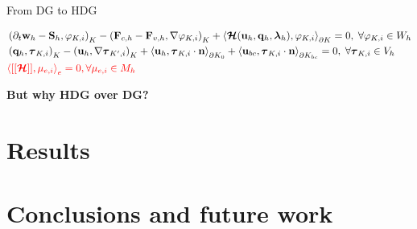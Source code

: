 \documentclass[24pt,t,table, aspectratio=169]{beamer}
\newcommand{\vecu}{\mathbf{u}}
\newcommand{\vecF}{\mathbf{F}}
\newcommand{\vecS}{\mathbf{S}}
\newcommand{\vecq}{\mathbf{q}}
\newcommand{\vecw}{\mathbf{w}}
\newcommand{\vectau}{\boldsymbol{\tau}}
\newcommand{\vecHcal}{\boldsymbol{\mathcal{H}}}
\newcommand{\veclambda}{\boldsymbol{\lambda}}
\newcommand{\vecn}{\mathbf{n}}
\begin{document}
\begin{frame}{From DG to HDG}
{
\begin{framed}
\small
\begin{equation*}
\begin{aligned}
& \left(\partial_t \vecw_{h} - \vecS_{h}, \varphi_{K,i} \right)_{K} - \left(\vecF_{c, {h}} - \vecF_{v, {h}}, \nabla \varphi_{K,i} \right)_{K} + \left\langle \vecHcal(\vecu_h, \vecq_h, \veclambda_h), \varphi_{K,i} \right\rangle_{\partial K} = 0, \; \forall \varphi_{K,i} \in W_h\\
& \left(\vecq_h, \vectau_{K,i}\right)_{K} - \left(\vecu_h, \nabla \vectau_{K',i}\right)_{K} + \left\langle \vecu_h, \vectau_{K,i} \cdot \vecn \right\rangle_{\partial K_0} + \left\langle \vecu_{bc}, \vectau_{K,i} \cdot \vecn \right\rangle_{\partial K_{bc}} = 0,\; \forall \vectau_{K,i} \in V_h\\
& \textcolor{red}{\left\langle[[\vecHcal]], \mu_{e,i} \right\rangle_{e} = 0, \forall \mu_{e,i} \in M_h}
\end{aligned}
\end{equation*}
\end{framed}

\begin{center}
\textbf{But why HDG over DG?}
\end{center}

}



\end{frame}

\section{Results}

\section{Conclusions and future work}
\end{document}
